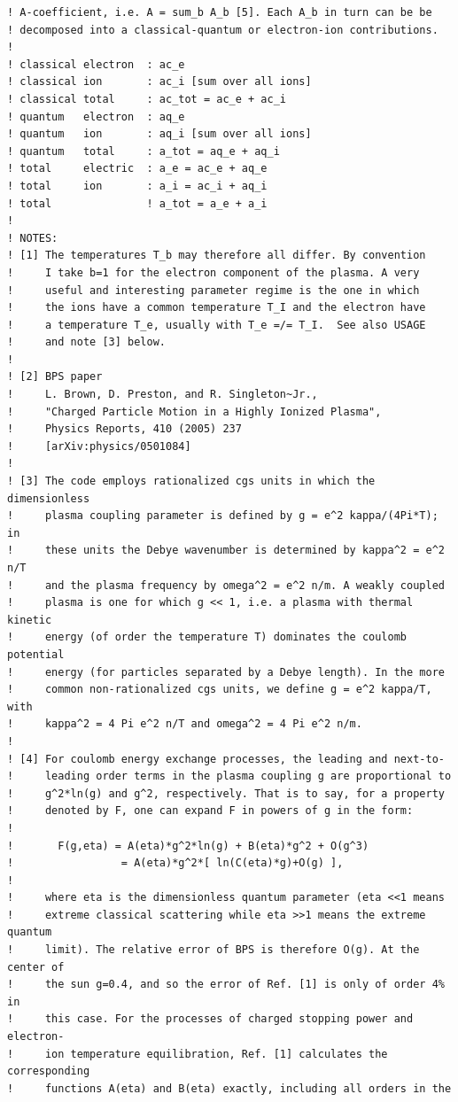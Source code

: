 \documentclass[preprint,12pt,eqsecnum,nofootinbib,amsmath,amssymb]{revtex4}
\begin{document}
{\begin{verbatim}
! A-coefficient, i.e. A = sum_b A_b [5]. Each A_b in turn can be be 
! decomposed into a classical-quantum or electron-ion contributions.
!
! classical electron  : ac_e
! classical ion       : ac_i [sum over all ions]
! classical total     : ac_tot = ac_e + ac_i 
! quantum   electron  : aq_e
! quantum   ion       : aq_i [sum over all ions]
! quantum   total     : a_tot = aq_e + aq_i
! total     electric  : a_e = ac_e + aq_e
! total     ion       : a_i = ac_i + aq_i
! total               ! a_tot = a_e + a_i
!
! NOTES:
! [1] The temperatures T_b may therefore all differ. By convention
!     I take b=1 for the electron component of the plasma. A very
!     useful and interesting parameter regime is the one in which 
!     the ions have a common temperature T_I and the electron have
!     a temperature T_e, usually with T_e =/= T_I.  See also USAGE
!     and note [3] below.
!
! [2] BPS paper
!     L. Brown, D. Preston, and R. Singleton~Jr., 
!     "Charged Particle Motion in a Highly Ionized Plasma",
!     Physics Reports, 410 (2005) 237
!     [arXiv:physics/0501084]
!
! [3] The code employs rationalized cgs units in which the dimensionless
!     plasma coupling parameter is defined by g = e^2 kappa/(4Pi*T); in 
!     these units the Debye wavenumber is determined by kappa^2 = e^2 n/T 
!     and the plasma frequency by omega^2 = e^2 n/m. A weakly coupled 
!     plasma is one for which g << 1, i.e. a plasma with thermal kinetic 
!     energy (of order the temperature T) dominates the coulomb potential 
!     energy (for particles separated by a Debye length). In the more 
!     common non-rationalized cgs units, we define g = e^2 kappa/T, with 
!     kappa^2 = 4 Pi e^2 n/T and omega^2 = 4 Pi e^2 n/m. 
!
! [4] For coulomb energy exchange processes, the leading and next-to-
!     leading order terms in the plasma coupling g are proportional to 
!     g^2*ln(g) and g^2, respectively. That is to say, for a property 
!     denoted by F, one can expand F in powers of g in the form:
!
!       F(g,eta) = A(eta)*g^2*ln(g) + B(eta)*g^2 + O(g^3) 
!                 = A(eta)*g^2*[ ln(C(eta)*g)+O(g) ],
!
!     where eta is the dimensionless quantum parameter (eta <<1 means
!     extreme classical scattering while eta >>1 means the extreme quantum 
!     limit). The relative error of BPS is therefore O(g). At the center of 
!     the sun g=0.4, and so the error of Ref. [1] is only of order 4% in 
!     this case. For the processes of charged stopping power and electron-
!     ion temperature equilibration, Ref. [1] calculates the corresponding
!     functions A(eta) and B(eta) exactly, including all orders in the 

\end{verbatim}}
\end{document}
